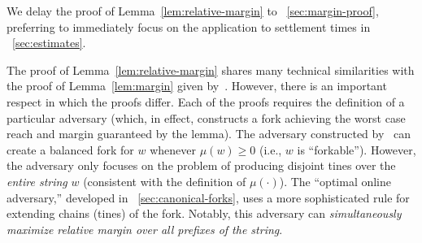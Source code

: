 We delay the proof of Lemma~\ref{lem:relative-margin} to
\Section~\ref{sec:margin-proof}, preferring to immediately focus on the
application to settlement times in \Section~\ref{sec:estimates}.

 The proof of Lemma~\ref{lem:relative-margin}
shares many technical similarities with the proof of
Lemma~\ref{lem:margin} given by~\citet{KRDO17}. However, there is an
important respect in which the proofs differ. Each of the proofs
requires the definition of a particular adversary (which, in effect,
constructs a fork achieving the worst case reach and margin guaranteed
by the lemma). The adversary constructed by~\cite{KRDO17} can create a
balanced fork for $w$ whenever $\mu(w) \geq 0$ (i.e., $w$ is
``forkable''). However, the adversary only focuses on the problem of
producing disjoint tines over the \emph{entire string} $w$ (consistent
with the definition of $\mu(\cdot)$). The ``optimal online adversary,''
developed in \Section~\ref{sec:canonical-forks},
uses a more sophisticated rule for extending chains (tines) of the
fork. 
Notably, this adversary can \emph{simultaneously maximize relative margin
  over all prefixes of the string}. 

%


